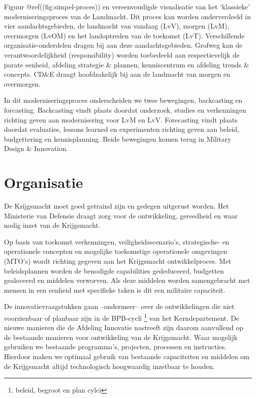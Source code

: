 \documentclass[
]{book}
\begin{document}
Figuur @ref((fig:simpel-proces)) en vereenvoudigde visualisatie van het `klassieke' moderniseringsproces van de Landmacht. Dit proces kan worden onderverdeeld in vier aandachtsgebieden, de landmacht van vandaag (LvV), morgen (LvM), overmorgen (LvOM) en het landoptreden van de toekomst (LvT). Verschillende organisatie-onderdelen dragen bij aan deze aandachtsgebieden. Grofweg kan de verantwoordelijkheid (responsibility) worden toebedeeld aan respectievelijk de parate eenheid, afdeling strategie \& plannen, kenniscentrum en afdeling trends \& concepts. CD\&E draagt hoofdzakelijk bij aan de landmacht van morgen en overmorgen.

In dit moderniseringsproces onderscheiden we twee bewegingen, backcasting en forcasting. Backcasting vindt plaats doordat onderzoek, studies en verkenningen richting geven aan modernisering voor LvM en LvV. Forecasting vindt plaats doordat evaluaties, lessons learned en experimenten richting geven aan beleid, budgettering en kennisplanning. Beide bewegingen komen terug in Military Design \& Innovation.

\hypertarget{cde-algemeen}{%
\chapter{Organisatie}\label{cde-algemeen}}

De Krijgsmacht moet goed getraind zijn en gedegen uitgerust worden. Het Ministerie van Defensie draagt zorg voor de ontwikkeling, gereedheid en waar nodig inzet van de Krijgsmacht.

Op basis van toekomst verkenningen, veiligheidsscenario's, strategische- en operationele concepten en mogelijke toekomstige operationele omgevingen (MTO's) wordt richting gegeven aan het Krijgsmacht ontwikkelproces. Met beleidsplannen worden de benodigde capabilities gededuceerd, budgetten gealoceerd en middelen verworven. Als deze middelen worden samengebracht met mensen in een eenheid met specifieke taken is dit een militaire capaciteit.

De innovatievraagstukken gaan --ondermeer-- over de ontwikkelingen die niet voorzienbaar of planbaar zijn in de BPB-cycli \footnote{beleid, begroot en plan cylci} van het Kerndepartement. De nieuwe manieren die de Afdeling Innovatie nastreeft zijn daarom aanvullend op de bestaande manieren voor ontwikkeling van de Krijgsmacht. Waar mogelijk gebruiken we bestaande programma's, projecten, processen en instructies. Hierdoor maken we optimaal gebruik van bestaande capaciteiten en middelen om de Krijgsmacht altijd technologisch hoogwaardig inzetbaar te houden.
\end{document}
